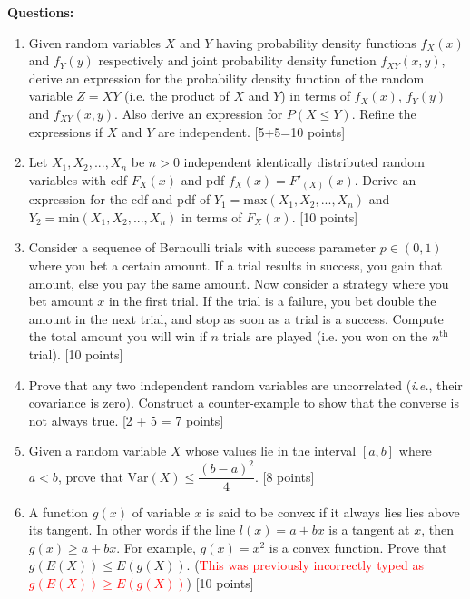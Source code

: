 \documentclass[11pt]{article}
\begin{document}
\textbf{Questions:}
\begin{enumerate}
\item Given random variables $X$ and $Y$ having probability density functions $f_X(x)$ and $f_Y(y)$ respectively and joint probability density function $f_{XY}(x,y)$, derive an expression for the probability density function of the random variable $Z = XY$ (i.e. the product of $X$ and $Y$) in terms of $f_X(x)$, $f_Y(y)$ and $f_{XY}(x,y)$. Also derive an expression for $P(X \leq Y)$. Refine the expressions if $X$ and $Y$ are independent. \textsf{[5+5=10 points]}

\item Let $X_1, X_2, ..., X_n$ be $n > 0$ independent identically distributed random variables with cdf $F_X(x)$ and pdf $f_X(x) = F'_(X)(x)$. Derive an expression for the cdf and pdf of $Y_1 = \textrm{max}(X_1, X_2, ..., X_n)$ and $Y_2 = \textrm{min}(X_1, X_2, ..., X_n)$ in terms of $F_X(x)$. \textsf{[10 points]}

\item Consider a sequence of Bernoulli trials with success parameter $p \in (0,1)$ where you bet a certain amount. If a trial results in success, you gain that amount, else you pay the same amount. Now consider a strategy where you bet amount $x$ in the first trial. If the trial is a failure, you bet double the amount in the next trial, and stop as soon as a trial is a success. Compute the total amount you will win if $n$ trials are played (i.e. you won on the $n^{\textrm{th}}$ trial). \textsf{[10 points]}

\item Prove that any two independent random variables are uncorrelated (\textit{i.e.}, their covariance is zero). Construct a counter-example to show that the converse is not always true. \textsf{[2 + 5 = 7 points]}

\item Given a random variable $X$ whose values lie in the interval $[a,b]$ where $a < b$, prove that $\textrm{Var}(X) \leq \dfrac{(b-a)^2}{4}$. \textsf{[8 points]}

\item A function $g(x)$ of variable $x$ is said to be convex if it always lies lies above its tangent. In other words if the line $l(x) = a + bx$ is a tangent at $x$, then $g(x) \geq a + bx$. For example, $g(x) = x^2$ is a convex function. Prove that $g(E(X)) \leq E(g(X))$. 
(\textcolor{red}{This was previously incorrectly typed as $g(E(X)) \geq E(g(X))$})
\textsf{[10 points]}


\end{enumerate}
\end{document}
